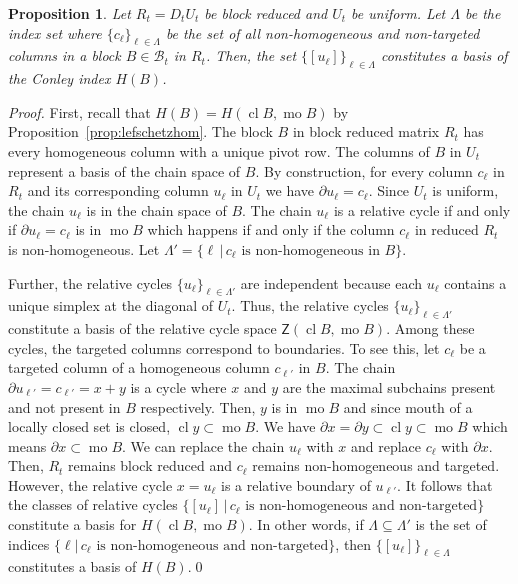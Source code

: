 \documentclass[letterpaper,11pt]{article}
\theoremstyle{plain}
\newtheorem{proposition}[theorem]{Proposition}
\theoremstyle{definition}
\newcommand{\cl}{\operatorname{cl}}
\DeclareMathOperator{\mo}{mo}
\newcommand{\Zgroup}{\mathsf{Z}}
\newcommand{\mv}{\mathcal{V}}
\newcommand{\md}{\mathcal{B}}
\begin{document}
\begin{proposition}
Let $R_t=D_tU_t$ be block reduced and $U_t$ be uniform. Let $\Lambda$ be the index set
where $\{c_\ell\}_{\ell\in \Lambda}$ be the set of all
non-homogeneous and non-targeted columns in a block $B\in \md_t$ in $R_t$.
Then, the set $\{[u_\ell]\}_{\ell\in \Lambda}$ constitutes a basis of the Conley index $H(B)$.
\label{prop:pointwiseBasis}
\end{proposition}
\begin{proof}
     First, recall that $H(B)= H(\cl B,\mo B)$ by Proposition~\ref{prop:lefschetzhom}. The block $B$ in block reduced matrix $R_t$ has
     every homogeneous column with a unique pivot row. The columns of $B$ in $U_t$ represent a basis of the chain space of $B$.
     By construction,
     for every column $c_\ell$ in $R_t$ and its corresponding column
     $u_\ell$ in $U_t$ we have $\partial u_\ell=c_\ell$. Since $U_t$ is
     uniform, the chain $u_\ell$ is in the chain space of $B$.
     The chain $u_\ell$ is a relative cycle if and only if $\partial u_\ell=c_\ell$ is
     in $\mo B$ which happens if and only if
     the column $c_\ell$ in reduced $R_t$ is non-homogeneous. Let $\Lambda'=\{\ell\,|\,c_\ell \mbox{ is non-homogeneous in } B\}$.
     
     Further, the relative cycles $\{u_\ell\}_{\ell\in \Lambda'}$ 
     are independent
     because each $u_\ell$ contains a unique simplex at the diagonal of $U_t$.
     Thus, the relative cycles $\{u_\ell\}_{\ell\in \Lambda'}$ constitute a basis of the relative cycle space $\Zgroup(\cl B,\mo B)$. 
     Among these cycles, the targeted columns correspond to boundaries. 
     To see this, let $c_\ell$ be a targeted column of a homogeneous column $c_{\ell'}$ in $B$. The
     chain $\partial u_{\ell'}=c_{\ell'}=x+y$ is a cycle where $x$ and $y$ are the maximal subchains
     present and not present in $B$ respectively. 
     Then, $y$ is in $\mo B$ and since mouth of a locally closed set is closed, $\cl y\subset \mo B$. 
     We have $\partial x=\partial y \subset \cl y \subset \mo B$ which means $\partial x\subset \mo B$.
     We can replace the chain $u_\ell$ with $x$ and replace $c_\ell$ with $\partial x$. 
     Then, $R_t$ remains block reduced and $c_\ell$ remains non-homogeneous and
     targeted.
     However, the relative cycle $x=u_\ell$ is a relative boundary of
     $u_{\ell'}$. It follows that the classes of relative cycles 
     $\{[u_\ell]\,| \,c_\ell \mbox{ is non-homogeneous and non-targeted}\}$
     constitute a basis for $H(\cl B,\mo B)$. In other words, if $\Lambda\subseteq \Lambda'$
         is the set of indices $\{\ell |\, c_\ell \mbox{ is non-homogeneous and non-targeted}\}$,
     then $\{[u_\ell]\}_{\ell\in \Lambda}$ constitutes a basis of $H(B)$.\qed       
     \end{proof}
\end{document}

